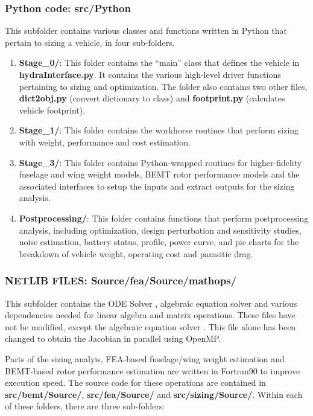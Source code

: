 \subsubsection{\textbf{Python code: src/Python}}
This subfolder contains various classes and functions written in Python that pertain to sizing a vehicle, in four sub-folders.
\begin{enumerate}
      \item \textbf{Stage\_0/}: This folder contains the ``main'' class that defines the vehicle in \textbf{hydraInterface.py}. It contains the various high-level driver functions pertaining to sizing and optimization. The folder also contains two other files, \textbf{dict2obj.py} (convert dictionary to class) and \textbf{footprint.py} (calculates vehicle footprint).
      \item \textbf{Stage\_1/}: This folder contains the workhorse routines that perform sizing with weight, performance and cost estimation.
      \item \textbf{Stage\_3/}: This folder contains Python-wrapped routines for higher-fidelity fuselage and wing weight models, BEMT rotor performance models and the associated interfaces to setup the inputs and extract outputs for the sizing analysis.  
      \item \textbf{Postprocessing/}: This folder contains functions that perform postprocessing analysis, including optimization, design perturbation and sensitivity studies, noise estimation, battery status, profile, power curve, and pie charts for the breakdown of vehicle weight, operating cost and parasitic drag. 
\end{enumerate}

\subsubsection{\textbf{NETLIB FILES: Source/fea/Source/mathops/}}
 This subfolder contains the ODE Solver , algebraic equation solver  and various dependencies needed for linear algebra and matrix operations. These files have not be modified, except the algebraic equation solver . This file alone has been changed to obtain the Jacobian in parallel using OpenMP.
 
Parts of the sizing analyis, FEA-based fuselage/wing weight estimation and BEMT-based rotor performance estimation are written in Fortran90 to improve execution speed. The source code for these operations are contained in \textbf{src/bemt/Source/}, \textbf{src/fea/Source/} and \textbf{src/sizing/Source/}. Within each of these folders, there are three sub-folders: 

